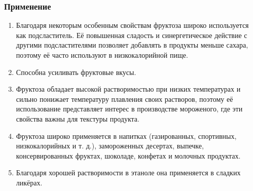 \documentclass[12pt]{article}
\begin{document}
\subsubsection*{Применение}
\begin{enumerate}
    \item Благодаря некоторым особенным свойствам фруктоза широко используется как подсластитель.
          Её повышенная сладость и синергетическое действие с другими подсластителями позволяет добавлять в продукты меньше сахара, поэтому её часто используют в низкокалорийной пище.
    \item Способна усиливать фруктовые вкусы.
    \item Фруктоза обладает высокой растворимостью при низких температурах и сильно понижает температуру плавления своих растворов, поэтому её использование представляет интерес в производстве мороженого, где эти свойства важны для текстуры продукта.
    \item Фруктоза широко применяется в напитках (газированных, спортивных, низкокалорийных и т. д.), замороженных десертах, выпечке, консервированных фруктах, шоколаде, конфетах и молочных продуктах.
    \item Благодаря хорошей растворимости в этаноле она применяется в сладких ликёрах.
\end{enumerate}
\end{document}
